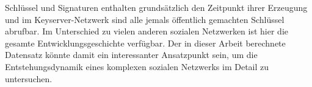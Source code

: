Schl\"ussel und Signaturen enthalten grunds\"atzlich den Zeitpunkt
ihrer Erzeugung und im Keyserver-Netzwerk sind alle jemals
\"offentlich gemachten Schl\"ussel abrufbar. Im Unterschied zu vielen
anderen sozialen Netzwerken ist hier die gesamte
Entwicklungsgeschichte verf\"ugbar. Der in dieser Arbeit berechnete
Datensatz k\"onnte damit ein interessanter Ansatzpunkt sein, um die
Entstehungsdynamik eines komplexen sozialen Netzwerks im Detail zu
untersuchen.

